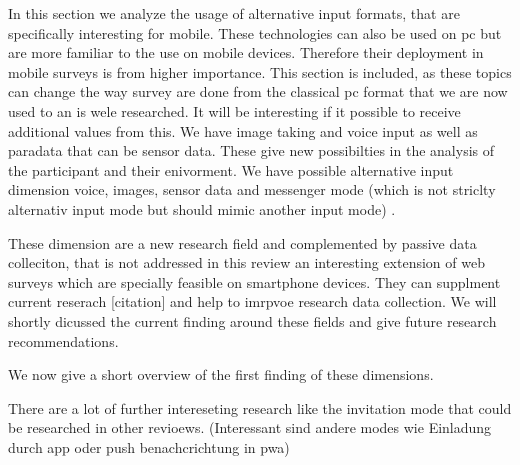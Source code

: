 In this section we analyze the usage of alternative input formats, that are specifically interesting for mobile. These technologies can also be used on pc but are more familiar to the use on mobile devices. Therefore their deployment in mobile surveys is from higher importance. This section is included, as these topics can change the way survey are done from the classical pc format that we are now used to an is wele researched. It will be interesting if it possible to receive additional values from this. We have image taking and voice input as well as paradata that can be sensor data. These give new possibilties in the analysis of the participant and their enivorment. We have possible alternative input dimension voice, images, sensor data and messenger mode (which is not striclty alternativ input mode but should mimic another input mode) . 

These dimension are a new research field and complemented by passive data colleciton, that is not addressed in this review an interesting extension of web surveys which are specially feasible on smartphone devices. They can supplment current reserach [citation] and help to imrpvoe research data collection. We will shortly dicussed the current finding around these fields and give future research recommendations. 

We now give a short overview of the first finding of these dimensions.

There are a lot of further intereseting research like the invitation mode that could be researched in other revioews. 
(Interessant sind andere modes wie Einladung durch app oder push benachcrichtung in pwa)